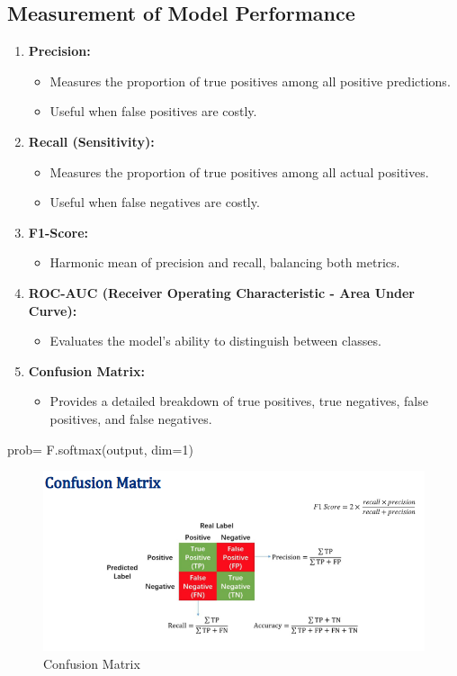 \documentclass[11pt, english]{article}
\begin{document}
\subsection{Measurement of Model Performance}
\begin{enumerate}
    \item \textbf{Precision:}
\begin{itemize}
    \item Measures the proportion of true positives among all positive predictions.
    \item Useful when false positives are costly.
\end{itemize}
    \item \textbf{Recall (Sensitivity):}
\begin{itemize}
    \item Measures the proportion of true positives among all actual positives.
    \item Useful when false negatives are costly.
\end{itemize}
    \item \textbf{F1-Score:}
\begin{itemize}
    \item Harmonic mean of precision and recall, balancing both metrics.
\end{itemize}
    \item \textbf{ROC-AUC (Receiver Operating Characteristic - Area Under Curve):}
\begin{itemize}
    \item Evaluates the model's ability to distinguish between classes.
\end{itemize}
    \item \textbf{Confusion Matrix:}
\begin{itemize}
    \item Provides a detailed breakdown of true positives, true negatives, false positives, and false negatives.
\end{itemize}
\end{enumerate}

prob= F.softmax(output, dim=1)
\begin{figure}
    \centering
    \includegraphics[width=0.75\linewidth]{ConfusionMatrix.png}
    \caption{Confusion Matrix}
    \label{fig:enter-label}
\end{figure}
\end{document}
